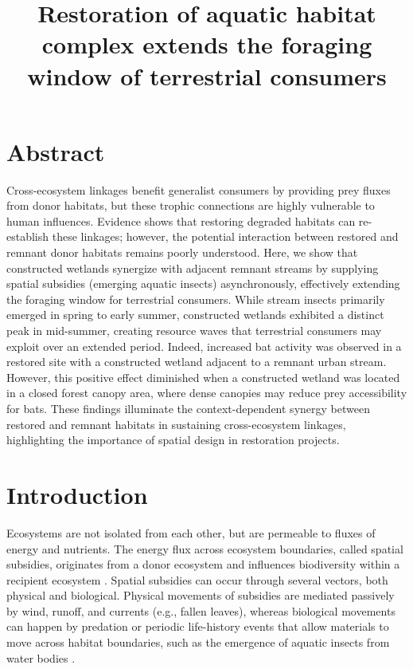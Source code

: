 \documentclass[11pt, class=article, crop=false]{standalone}
\title{Restoration of aquatic habitat complex extends the foraging window of terrestrial consumers}
\date{} %
\author{}
\begin{document}
\maketitle

\section*{Abstract}

Cross-ecosystem linkages benefit generalist consumers by providing prey fluxes from donor habitats, but these trophic connections are highly vulnerable to human influences.
Evidence shows that restoring degraded habitats can re-establish these linkages; however, the potential interaction between restored and remnant donor habitats remains poorly understood.  
Here, we show that constructed wetlands synergize with adjacent remnant streams by supplying spatial subsidies (emerging aquatic insects) asynchronously, effectively extending the foraging window for terrestrial consumers.
While stream insects primarily emerged in spring to early summer, constructed wetlands exhibited a distinct peak in mid-summer, creating resource waves that terrestrial consumers may exploit over an extended period.  
Indeed, increased bat activity was observed in a restored site with a constructed wetland adjacent to a remnant urban stream.
However, this positive effect diminished when a constructed wetland was located in a closed forest canopy area, where dense canopies may reduce prey accessibility for bats.
These findings illuminate the context-dependent synergy between restored and remnant habitats in sustaining cross-ecosystem linkages, highlighting the importance of spatial design in restoration projects.

\section{Introduction}

Ecosystems are not isolated from each other, but are permeable to fluxes of energy and nutrients.
The energy flux across ecosystem boundaries, called spatial subsidies, originates from a donor ecosystem and influences biodiversity within a recipient ecosystem \citep{polis_toward_1997}.
Spatial subsidies can occur through several vectors, both physical and biological.
Physical movements of subsidies are mediated passively by wind, runoff, and currents (e.g., fallen leaves), whereas biological movements can happen by predation or periodic life-history events that allow materials to move across habitat boundaries, such as the emergence of aquatic insects from water bodies \citep{polis_toward_1997, baxter_tangled_2005, schindler_subsidies_2017}.
\end{document}
